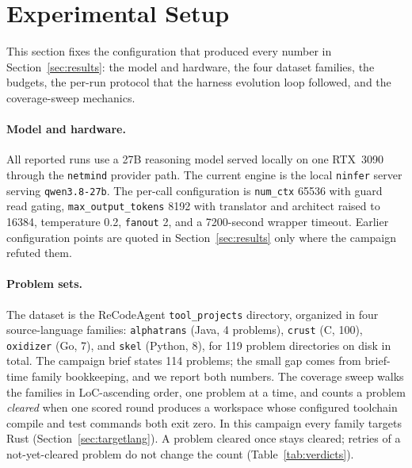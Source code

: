 \documentclass[11pt]{article}
\begin{document}
\section{Experimental Setup}
\label{sec:setup}

This section fixes the configuration that produced every number in
Section~\ref{sec:results}: the model and hardware, the four dataset
families, the budgets, the per-run protocol that the harness evolution loop
followed, and the coverage-sweep mechanics.

\paragraph{Model and hardware.}
All reported runs use a 27B reasoning model served locally on one
RTX~3090 through the \texttt{netmind} provider path. The current engine
is the local \texttt{ninfer} server serving \texttt{qwen3.8-27b}.
The
per-call configuration is
\texttt{num\_ctx} 65536 with guard read gating,
\texttt{max\_out\allowbreak{}put\_to\allowbreak{}kens} 8192 with
translator and architect raised
to 16384, temperature 0.2, \texttt{fanout} 2, and a 7200-second wrapper
timeout. Earlier configuration points are quoted in
Section~\ref{sec:results} only where the campaign refuted them.

\paragraph{Problem sets.}
The dataset is the ReCodeAgent \texttt{tool\_projects} directory,
organized in four source-language families: \texttt{alphatrans}
(Java, 4 problems),
\texttt{crust} (C, 100), \texttt{oxidizer} (Go, 7), and \texttt{skel}
(Python, 8), for
119 problem directories on disk in total. The campaign brief states 114
problems; the small gap comes from brief-time family bookkeeping, and we
report both numbers. The coverage sweep walks the families in
LoC-ascending order, one problem at a time, and counts a problem
\emph{cleared} when one scored round produces a workspace whose
configured toolchain compile and test commands both exit zero. In this
campaign every family targets Rust
(Section~\ref{sec:targetlang}). A problem cleared
once stays cleared; retries of a not-yet-cleared problem do not change
the count (Table~\ref{tab:verdicts}).
\end{document}

